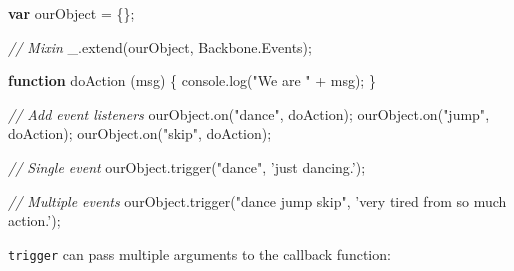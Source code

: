 \documentclass[9pt]{book}
\newenvironment{Shaded}{}{}
\newcommand{\KeywordTok}[1]{\textcolor[rgb]{0.00,0.44,0.13}{\textbf{{#1}}}}
\newcommand{\StringTok}[1]{\textcolor[rgb]{0.25,0.44,0.63}{{#1}}}
\newcommand{\CommentTok}[1]{\textcolor[rgb]{0.38,0.63,0.69}{\textit{{#1}}}}
\newcommand{\OtherTok}[1]{\textcolor[rgb]{0.00,0.44,0.13}{{#1}}}
\newcommand{\FunctionTok}[1]{\textcolor[rgb]{0.02,0.16,0.49}{{#1}}}
\newcommand{\NormalTok}[1]{{#1}}
\begin{document}
\begin{Shaded}
\begin{Highlighting}[]
\KeywordTok{var} \NormalTok{ourObject = \{\};}

\CommentTok{// Mixin}
\OtherTok{_}\NormalTok{.}\FunctionTok{extend}\NormalTok{(ourObject, }\OtherTok{Backbone}\NormalTok{.}\FunctionTok{Events}\NormalTok{);}

\KeywordTok{function} \FunctionTok{doAction} \NormalTok{(msg) \{ }\OtherTok{console}\NormalTok{.}\FunctionTok{log}\NormalTok{(}\StringTok{"We are "} \NormalTok{+ msg); \}}

\CommentTok{// Add event listeners}
\OtherTok{ourObject}\NormalTok{.}\FunctionTok{on}\NormalTok{(}\StringTok{"dance"}\NormalTok{, doAction);}
\OtherTok{ourObject}\NormalTok{.}\FunctionTok{on}\NormalTok{(}\StringTok{"jump"}\NormalTok{, doAction);}
\OtherTok{ourObject}\NormalTok{.}\FunctionTok{on}\NormalTok{(}\StringTok{"skip"}\NormalTok{, doAction);}

\CommentTok{// Single event}
\OtherTok{ourObject}\NormalTok{.}\FunctionTok{trigger}\NormalTok{(}\StringTok{"dance"}\NormalTok{, }\StringTok{'just dancing.'}\NormalTok{);}

\CommentTok{// Multiple events}
\OtherTok{ourObject}\NormalTok{.}\FunctionTok{trigger}\NormalTok{(}\StringTok{"dance jump skip"}\NormalTok{, }\StringTok{'very tired from so much action.'}\NormalTok{);}
\end{Highlighting}
\end{Shaded}

\texttt{trigger} can pass multiple arguments to the callback function:
\end{document}
